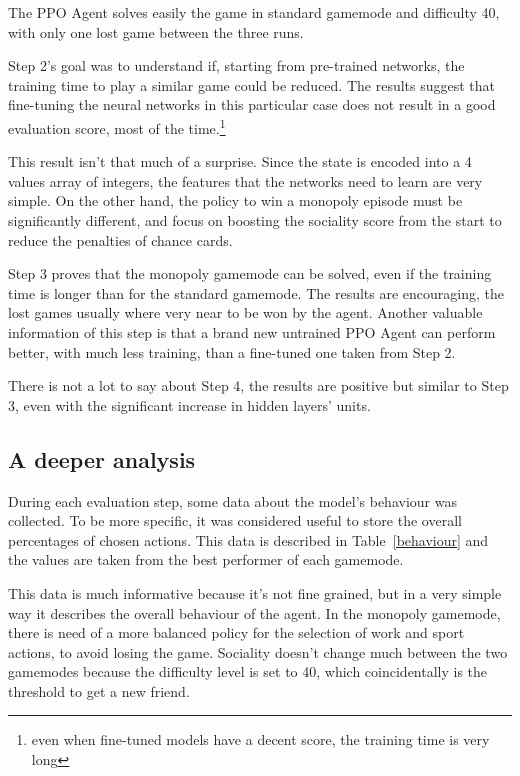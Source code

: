 \documentclass{article}
\begin{document}
The PPO Agent solves easily the game in standard gamemode and difficulty 40, with only one lost game between the three runs. 

Step 2's goal was to understand if, starting from pre-trained networks, the training time to play a similar game could be reduced. The results suggest that fine-tuning the neural networks in this particular case does not result in a good evaluation score, most of the time.\footnote{even when fine-tuned models have a decent score, the training time is very long} 

This result isn't that much of a surprise. Since the state is encoded into a 4 values array of integers, the features that the networks need to learn are very simple. 
On the other hand, the policy to win a monopoly episode must be significantly different, and focus on boosting the sociality score from the start to reduce the penalties of chance cards.

Step 3 proves that the monopoly gamemode can be solved, even if the training time is longer than for the standard gamemode. The results are encouraging, the lost games usually where very near to be won by the agent. Another valuable information of this step is that a brand new untrained PPO Agent can perform better, with much less training, than a fine-tuned one taken from Step 2.

There is not a lot to say about Step 4, the results are positive but similar to Step 3, even with the significant increase in hidden layers' units.


\subsection{A deeper analysis}

During each evaluation step, some data about the model's behaviour was collected. To be more specific, it was considered useful to store the overall percentages of chosen actions. This data is described in Table~\ref{behaviour} and the values are taken from the best performer of each gamemode.

This data is much informative because it's not fine grained, but in a very simple way it describes the overall behaviour of the agent. In the monopoly gamemode, there is need of a more balanced policy for the selection of work and sport actions, to avoid losing the game. Sociality doesn't change much between the two gamemodes because the difficulty level is set to 40, which coincidentally is the threshold to get a new friend.
\end{document}
